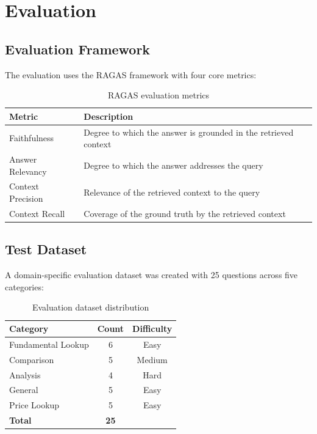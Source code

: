 \documentclass[12pt,a4paper]{article}
\begin{document}
\section{Evaluation}
\label{sec:evaluation}

\subsection{Evaluation Framework}

The evaluation uses the RAGAS framework with four core metrics:

\begin{table}[H]
\centering
\caption{RAGAS evaluation metrics}
\label{tab:metrics}
\begin{tabular}{lp{7cm}}
\toprule
\textbf{Metric} & \textbf{Description} \\
\midrule
Faithfulness & Degree to which the answer is grounded in the retrieved context \\
Answer Relevancy & Degree to which the answer addresses the query \\
Context Precision & Relevance of the retrieved context to the query \\
Context Recall & Coverage of the ground truth by the retrieved context \\
\bottomrule
\end{tabular}
\end{table}

\subsection{Test Dataset}

A domain-specific evaluation dataset was created with 25 questions across
five categories:

\begin{table}[H]
\centering
\caption{Evaluation dataset distribution}
\label{tab:dataset}
\begin{tabular}{lcc}
\toprule
\textbf{Category} & \textbf{Count} & \textbf{Difficulty} \\
\midrule
Fundamental Lookup & 6 & Easy \\
Comparison & 5 & Medium \\
Analysis & 4 & Hard \\
General & 5 & Easy \\
Price Lookup & 5 & Easy \\
\midrule
\textbf{Total} & \textbf{25} & \\
\bottomrule
\end{tabular}
\end{table}
\end{document}
